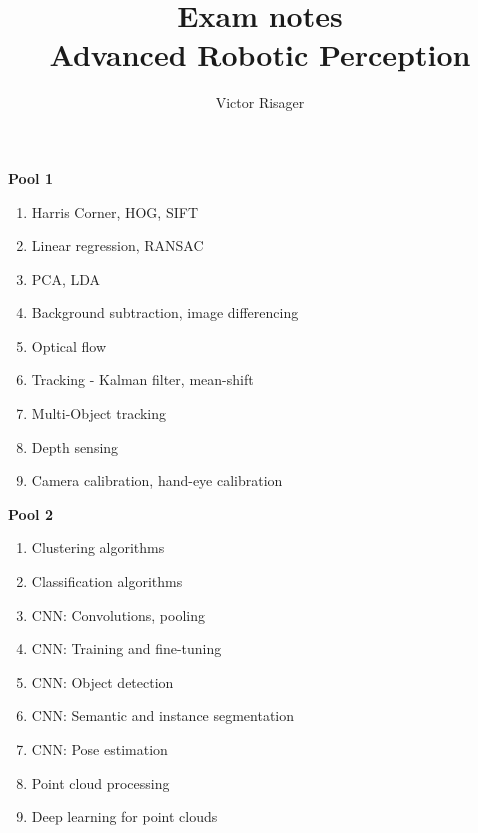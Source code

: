 \documentclass[a4paper]{article}
\title{Exam notes\\
	\large Advanced Robotic Perception}
\author{Victor Risager}
\begin{document}
\maketitle

\tableofcontents

\textbf{Pool 1}
\begin{enumerate}
	\item Harris Corner, HOG, SIFT
	\item Linear regression, RANSAC
	\item PCA, LDA
	\item Background subtraction, image differencing
	\item Optical flow
	\item Tracking - Kalman filter, mean-shift
	\item Multi-Object tracking
	\item Depth sensing
	\item Camera calibration, hand-eye calibration
\end{enumerate}

\textbf{Pool 2}
\begin{enumerate}
	\item Clustering algorithms
	\item Classification algorithms
	\item CNN: Convolutions, pooling
	\item CNN: Training and fine-tuning
	\item CNN: Object detection
	\item CNN: Semantic and instance segmentation
	\item CNN: Pose estimation
	\item Point cloud processing
	\item Deep learning for point clouds
\end{enumerate}



\newpage
\end{document}
